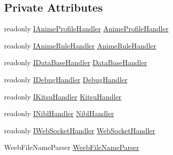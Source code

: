\subsection*{Private Attributes}
\begin{DoxyCompactItemize}
\item 
readonly \mbox{\hyperlink{interface_little_weeb_library_1_1_handlers_1_1_i_anime_profile_handler}{I\+Anime\+Profile\+Handler}} \mbox{\hyperlink{class_little_weeb_library_1_1_services_1_1_info_api_web_socket_service_a7e7e0952bac653aa1fd30d80908d43ec}{Anime\+Profile\+Handler}}
\item 
readonly \mbox{\hyperlink{interface_little_weeb_library_1_1_handlers_1_1_i_anime_rule_handler}{I\+Anime\+Rule\+Handler}} \mbox{\hyperlink{class_little_weeb_library_1_1_services_1_1_info_api_web_socket_service_a81ad38ad6b1f50e306cbb5cf239137d5}{Anime\+Rule\+Handler}}
\item 
readonly \mbox{\hyperlink{interface_little_weeb_library_1_1_handlers_1_1_i_data_base_handler}{I\+Data\+Base\+Handler}} \mbox{\hyperlink{class_little_weeb_library_1_1_services_1_1_info_api_web_socket_service_aa87338ed549d0abc2d2b4894950500d2}{Data\+Base\+Handler}}
\item 
readonly \mbox{\hyperlink{interface_little_weeb_library_1_1_handlers_1_1_i_debug_handler}{I\+Debug\+Handler}} \mbox{\hyperlink{class_little_weeb_library_1_1_services_1_1_info_api_web_socket_service_a1f53858532221c78f417c0a491349c5c}{Debug\+Handler}}
\item 
readonly \mbox{\hyperlink{interface_little_weeb_library_1_1_handlers_1_1_i_kitsu_handler}{I\+Kitsu\+Handler}} \mbox{\hyperlink{class_little_weeb_library_1_1_services_1_1_info_api_web_socket_service_a4fd3b1c29fc707e20f4c5626e158a391}{Kitsu\+Handler}}
\item 
readonly \mbox{\hyperlink{interface_little_weeb_library_1_1_handlers_1_1_i_nibl_handler}{I\+Nibl\+Handler}} \mbox{\hyperlink{class_little_weeb_library_1_1_services_1_1_info_api_web_socket_service_aa18b0760be9ba6aa8f1aab048588173b}{Nibl\+Handler}}
\item 
readonly \mbox{\hyperlink{interface_little_weeb_library_1_1_handlers_1_1_i_web_socket_handler}{I\+Web\+Socket\+Handler}} \mbox{\hyperlink{class_little_weeb_library_1_1_services_1_1_info_api_web_socket_service_a6a413fe47a289e28c63d48cb758828f3}{Web\+Socket\+Handler}}
\item 
Weeb\+File\+Name\+Parser \mbox{\hyperlink{class_little_weeb_library_1_1_services_1_1_info_api_web_socket_service_a87e98d408b1c2336a95736ac7bd416d4}{Weeb\+File\+Name\+Parser}}
\end{DoxyCompactItemize}


